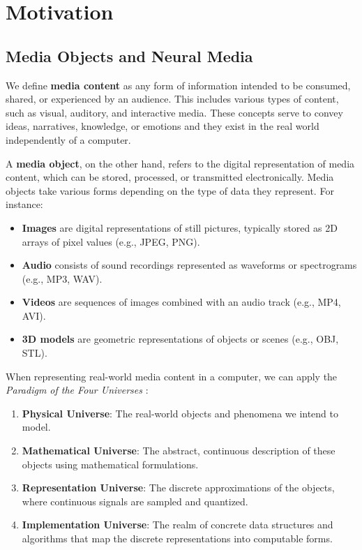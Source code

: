 
\section{Motivation}

\subsection{Media Objects and Neural Media}

We define \textbf{media content} as any form of information intended to be consumed, shared, or experienced by an audience. This includes various types of content, such as visual, auditory, and interactive media. These concepts serve to convey ideas, narratives, knowledge, or emotions and they exist in the real world independently of a computer.

A \textbf{media object}, on the other hand, refers to the digital representation of media content, which can be stored, processed, or transmitted electronically. Media objects take various forms depending on the type of data they represent. For instance:

\begin{itemize}
\item \textbf{Images} are digital representations of still pictures, typically stored as 2D arrays of pixel values (e.g., JPEG, PNG).
\item \textbf{Audio} consists of sound recordings represented as waveforms or spectrograms (e.g., MP3, WAV).
\item \textbf{Videos} are sequences of images combined with an audio track (e.g., MP4, AVI).
\item \textbf{3D models} are geometric representations of objects or scenes (e.g., OBJ, STL).
\end{itemize}

When representing real-world media content in a computer, we can apply the \textit{Paradigm of the Four Universes} \citep{gomes1995}:

\begin{enumerate}
\item \textbf{Physical Universe}: The real-world objects and phenomena we intend to model.
\item \textbf{Mathematical Universe}: The abstract, continuous description of these objects using mathematical formulations.
\item \textbf{Representation Universe}: The discrete approximations of the objects, where continuous signals are sampled and quantized.
\item \textbf{Implementation Universe}: The realm of concrete data structures and algorithms that map the discrete representations into computable forms.
\end{enumerate}

